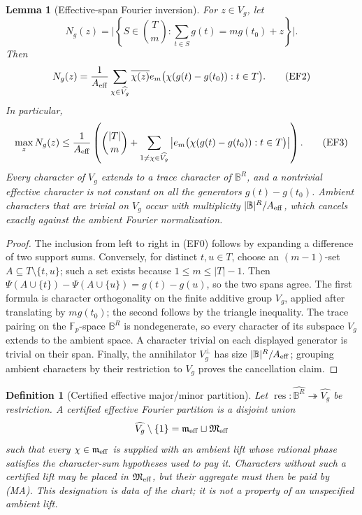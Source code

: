 \documentclass[12pt,a4paper]{amsart}
\numberwithin{equation}{section}
\newtheorem{lemma}[lemma]{Lemma}
\newtheorem{definition}[definition]{Definition}
\theoremstyle{remark}
\newcommand{\F}{\mathbb F}
\newcommand{\B}{\mathbb B}
\newcommand{\abs}[1]{\lvert #1\rvert}
\begin{document}
\begin{lemma}[Effective-span Fourier inversion]
\label{lem:effective-span-fourier}
For \(z\in V_g\), let
\[
 N_g(z)=\abs{\left\{S\in\binom Tm:
       \sum_{t\in S}g(t)=m g(t_0)+z\right\}}.
\]
Then
\[
 N_g(z)=\frac1{A_{\rm eff}}
 \sum_{\chi\in\widehat{V_g}}\overline{\chi(z)}
 e_m\bigl(\chi(g(t)-g(t_0)):t\in T\bigr).           \tag{EF2}
\]
In particular,
\[
 \max_zN_g(z)\le\frac1{A_{\rm eff}}
 \left(\binom{\abs T}m+
 \sum_{1\ne\chi\in\widehat{V_g}}
 \left|e_m\bigl(\chi(g(t)-g(t_0)):t\in T\bigr)\right|\right). \tag{EF3}
\]
Every character of \(V_g\) extends to a trace character of \(\B^R\),
and a nontrivial effective character is not constant on all the generators
\(g(t)-g(t_0)\).  Ambient characters that are trivial on \(V_g\) occur
with multiplicity \(\abs{\B}^R/A_{\rm eff}\), which cancels exactly
against the ambient Fourier normalization.
\end{lemma}

\begin{proof}
The inclusion from left to right in \textup{(EF0)} follows by expanding a
difference of two support sums.  Conversely, for distinct \(t,u\in T\),
choose an \((m-1)\)-set \(A\subseteq T\setminus\{t,u\}\); such a set
exists because \(1\le m\le\abs T-1\).  Then
\(\Psi(A\cup\{t\})-\Psi(A\cup\{u\})=g(t)-g(u)\), so the two spans agree.
The first formula is character orthogonality on the finite additive group
\(V_g\), applied after translating by \(m g(t_0)\); the second follows by
the triangle inequality.  The trace pairing on the \(\F_p\)-space
\(\B^R\) is nondegenerate, so every character of its subspace \(V_g\)
extends to the ambient space.  A character trivial on each displayed
generator is trivial on their span.  Finally, the annihilator
\(V_g^\perp\) has size \(\abs{\B}^R/A_{\rm eff}\); grouping ambient
characters by their restriction to \(V_g\) proves the cancellation claim.
\end{proof}

\begin{definition}[Certified effective major/minor partition]
\label{def:effective-major-minor}
Let
\(\operatorname{res}:\widehat{\B^R}\twoheadrightarrow\widehat{V_g}\)
be restriction.  A \emph{certified effective Fourier partition} is a
disjoint union
\[
 \widehat{V_g}\setminus\{1\}
 =\mathfrak m_{\rm eff}\sqcup\mathfrak M_{\rm eff}
\]
such that every \(\chi\in\mathfrak m_{\rm eff}\) is supplied with an
ambient lift whose rational phase satisfies the character-sum hypotheses
used to pay it.  Characters without such a certified lift may be placed in
\(\mathfrak M_{\rm eff}\), but their aggregate must then be paid by
\textup{(MA)}.  This designation is data of the chart; it is not a
property of an unspecified ambient lift.
\end{definition}
\end{document}
